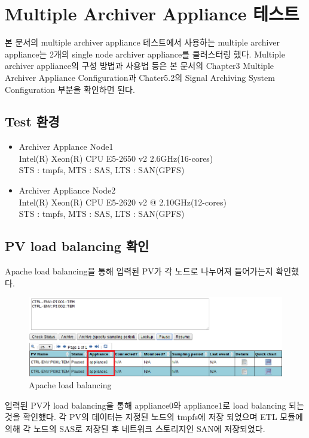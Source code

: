 \documentclass[11pt
  , a4paper
  , article
  , oneside
]{memoir}
\begin{document}
\clearpage
\section{Multiple Archiver Appliance 테스트}
본 문서의 multiple archiver appliance 테스트에서 사용하는 multiple archiver appliance는 2개의 single node archiver appliance를 클러스터링 했다. Multiple archiver appliance의 구성 방법과 사용법 등은 본 문서의 Chapter3 Multiple Archiver Appliance Configuration과 Chater5.2의 Signal Archiving System Configuration 부분을 확인하면 된다.
\subsection{Test 환경}
\begin{itemize}
	\item Archiver Applance Node1\\
	Intel(R) Xeon(R) CPU E5-2650 v2 2.6GHz(16-cores)\\
	STS : tmpfs, MTS : SAS, LTS : SAN(GPFS)
	\item Archiver Appliance Node2\\
	Intel(R) Xeon(R) CPU E5-2620 v2 @ 2.10GHz(12-cores)\\
	STS : tmpfs, MTS : SAS, LTS : SAN(GPFS)
\end{itemize}
\subsection{PV load balancing 확인}
Apache load balancing을 통해 입력된 PV가 각 노드로 나누어져 들어가는지 확인했다.
\begin{figure}[h!]
	\centering
	\includegraphics[width=1\textwidth, height=0.2\textheight]{./images/Selection_007.png}
	\caption{Apache load balancing}
\end{figure}

입력된 PV가 load balancing을 통해 appliance0와 appliance1로 load balancing 되는 것을 확인했다. 각 PV의 데이터는 지정된 노드의 tmpfs에 저장 되었으며 ETL 모듈에 의해 각 노드의 SAS로 저장된 후 네트워크 스토리지인 SAN에 저장되었다.
\end{document}
